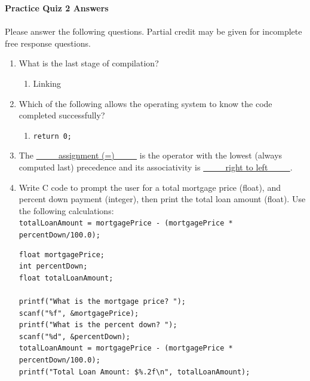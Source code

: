\documentclass[letter,11pt]{article}
\newcommand*\tick{\item[\Checkmark]}
\begin{document}
\huge
\textbf{Practice Quiz 2 Answers}
\normalsize

\paragraph{}Please answer the following questions. Partial credit may be given for incomplete free response questions.

\begin{enumerate}
    \item What is the last stage of compilation?
    \begin{enumerate}
        \tick Linking
    \end{enumerate}
    
    \item Which of the following allows the operating system to know the code completed successfully?
    \begin{enumerate}
        \tick \texttt{return 0;}
    \end{enumerate}
    
    \item The \underline{~~ ~~ assignment (=) ~~ ~~} is the operator with the lowest (always computed last) precedence and its associativity is \underline{~~ ~~ right to left ~~ ~~}.
    
    \item Write C code to prompt the user for a total mortgage price (float), and percent down payment (integer), then print the total loan amount (float). Use the following calculations: \\
    \texttt{totalLoanAmount = mortgagePrice - (mortgagePrice * percentDown/100.0);}
    \begin{verbatim}
float mortgagePrice;
int percentDown;
float totalLoanAmount;

printf("What is the mortgage price? ");
scanf("%f", &mortgagePrice);
printf("What is the percent down? ");
scanf("%d", &percentDown);
totalLoanAmount = mortgagePrice - (mortgagePrice * percentDown/100.0);
printf("Total Loan Amount: $%.2f\n", totalLoanAmount);
    \end{verbatim}
    

\end{enumerate}
\end{document}
